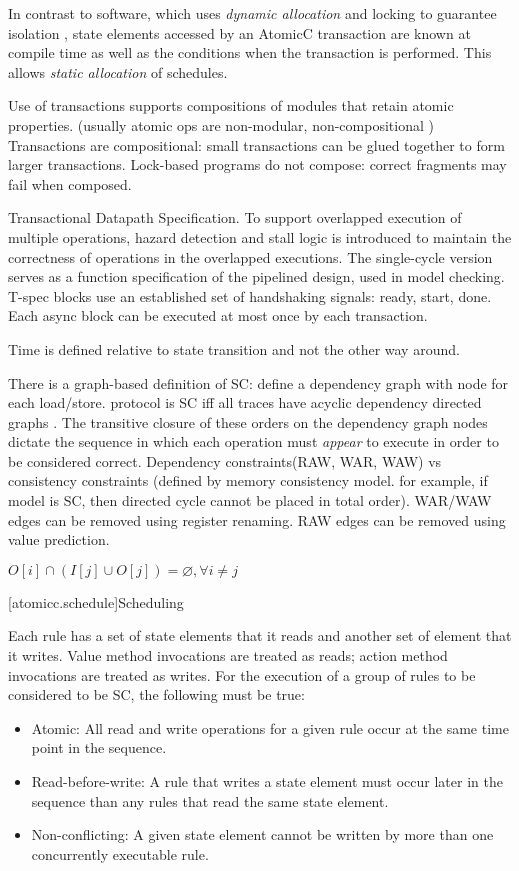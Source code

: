 In contrast to software, which uses \textit{dynamic allocation} and locking to guarantee isolation
\cite[p.~377]{GrayR93} \cite[Sec.~11.2]{OV11},
state elements accessed by an AtomicC transaction are known at compile time as well as the
conditions when the transaction is performed.  This allows \textit{static allocation}
\cite[Sec.~7.3.1]{GrayR93} of schedules.

Use of transactions supports compositions of modules that 
retain atomic properties.  (usually atomic ops are non-modular, non-compositional
\cite{harris2005composable}
\cite{NikhilSemantics})
Transactions are compositional: small transactions can be glued together to form 
larger transactions\cite{harris2005composable}.
Lock-based programs do not compose: correct fragments may fail when composed.

Transactional Datapath Specification.  \cite{nurvitadhi2011automatic}
To support overlapped execution of multiple operations,
hazard detection and stall logic is introduced to maintain
the correctness of operations in the overlapped executions.
The single-cycle version serves as a function specification of the pipelined
design, used in model checking.
T-spec blocks use an established set of handshaking signals: ready, start, done.
Each async block can be executed at most once by each transaction.

Time is defined relative to state transition and not the other way around.
\cite{fox2003algebraic}

There is a graph-based definition of SC: define a dependency graph with node for each load/store.
protocol is SC iff all traces have acyclic dependency directed graphs
\cite{Cain2003}.
The transitive closure of these orders on the dependency graph nodes dictate
the sequence in which each operation must \textit{appear} to execute in order to
be considered correct.
Dependency constraints(RAW, WAR, WAW) vs consistency constraints (defined by memory consistency model.  for example, if model is SC, then directed cycle cannot be placed in total order).
WAR/WAW edges can be removed using register renaming.  RAW edges
can be removed using value prediction.

$O[i] \cap (I[j] \cup O[j]) = \varnothing, \forall i \neq j $
\cite[Sec.~7.3]{GrayR93}

[atomicc.schedule]{Scheduling}

Each rule has a set of state elements that it reads and another set of element that it writes.
Value method invocations are treated as reads; action method invocations are treated as writes.
For the execution of a group of rules to be considered to be SC, the following must
be true:
\begin{itemize}
\item Atomic: All read and write operations for a given rule occur at the same time point in the sequence.
\item Read-before-write:  A rule that writes a state element must occur later in the sequence
than any rules that read the same state element.
\item Non-conflicting: A given state element cannot be written by more than one concurrently executable rule.
\end{itemize}

